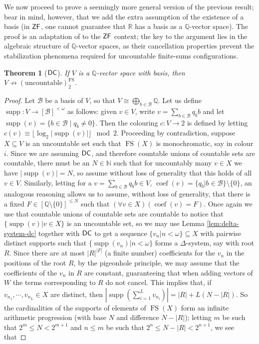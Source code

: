 \documentclass[10pt,a4paper]{amsart}
\newtheorem{theorem}{Theorem}[section]
\theoremstyle{definition}
\newcommand{\zf}{\mathnormal{\mathsf{ZF}}}
\newcommand{\dc}{\mathnormal{\mathsf{DC}}}
\theoremstyle{remark}
\numberwithin{equation}{section}
\begin{document}
We now proceed to prove a seemingly more general version of the previous result; bear in mind, however, that we add the extra assumption of the existence of a basis (in $\zf$, one cannot guarantee that $\mathbb R$ has a basis as a $\mathbb Q$-vector space). The proof is an adaptation of \cite[Theorem 5]{Fernandez2018} to the $\zf$ context; the key to the argument lies in the algebraic structure of $\mathbb{Q}$-vector spaces, as their cancellation properties prevent the stabilization phenomena required for uncountable finite-sums configurations.

\begin{theorem}[$\dc$]\label{thm:hindman-fails-uncountable}
If $V$ is a $\mathbb{Q}$-vector space with basis, then $V\nrightarrow(\mathrm{uncountable})^{\operatorname{FS}}_{2}$.
\end{theorem}
    \begin{proof}
        Let $\mathcal{B}$ be a basis of $V$, so that $V\cong\bigoplus_{b\in\mathcal{B}}\mathbb{Q}$. Let us define $\operatorname{supp}:V\to[\mathcal{B}]^{<\omega}$ as follows: given $v\in V$, write $v=\sum_{b\in\mathcal{B}}q_{b}b$ and let $\operatorname{supp}(v)=\{b\in\mathcal{B}\mid q_{b}\neq0\}$. Then the colouring $c:V\longrightarrow 2$ is defined by letting $c(v)\equiv\lfloor\log_{2}|\operatorname{supp}(v)|\rfloor\mod 2$. Proceeding by contradiction, suppose $X\subseteq V$ is an uncountable set such that $\operatorname{FS}(X)$ is monochromatic, say in colour $i$. Since we are assuming $\dc$, and therefore countable unions of countable sets are countable, there must be an $N\in\mathbb N$ such that for uncountably many $v\in X$ we have $|\operatorname{supp}(v)|=N$, so assume without loss of generality that this holds of all $v\in V$. Similarly, letting for a $v=\sum_{b\in\mathcal{B}}q_{b}b\in V$, $\operatorname{coef}(v)=\{q_{b}\big| b\in\mathcal{B}\}\setminus\{0\}$, an analogous reasoning allows us to assume, without loss of generality, that there is a fixed $F\in[\mathbb{Q}\setminus\{0\}]^{\leq N}$ such that $(\forall v\in X)(\operatorname{coef}(v)=F)$. Once again we use that countable unions of countable sets are countable to notice that $\{\operatorname{supp}(v)\big|v\in X\}$ is an uncountable set, so we may use Lemma \ref{lem:delta-system-dc} together with $\dc$ to get a sequence $\{v_{n}|n<\omega\}\subseteq X$ with pairwise distinct supports such that $\{\operatorname{supp}(v_n)\big|n<\omega\}$ forms a $\Delta$-system, say with root $R$. Since there are at most $|R|^{|F|}$ (a finite number) coefficients for the $v_{n}$ in the positions of the root $R$, by the pigeonhole principle, we may assume that the coefficients of the $v_{n}$ in $R$ are constant, guaranteeing that when adding vectors of $W$ the terms corresponding to $R$ do not cancel. This implies that, if $v_{n_{1}},\cdots,v_{n_{L}}\in X$ are distinct, then $\left|\operatorname{supp}\left(\sum_{i=1}^{L}v_{n_{i}}\right)\right|=|R|+L(N-|R|)$. So the cardinalities of the supports of elements of $\operatorname{FS}(X)$ form an infinite arithmetic progression (with base $N$ and difference $N-|R|$); letting $m$ be such that $2^{m}\leq N<2^{m+1}$ and $n\leq m$ be such that $2^{n}\leq N-|R|<2^{n+1}$, we see that 

\end{proof}
\end{document}
